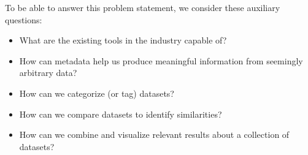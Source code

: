 To be able to answer this problem statement, we consider these auxiliary questions:
\begin{itemize}
    \item What are the existing tools in the industry capable of?
    \item How can metadata help us produce meaningful information from seemingly arbitrary data?
    \item How can we categorize (or tag) datasets?
    \item How can we compare datasets to identify similarities?
    \item How can we combine and visualize relevant results about a collection of datasets?
\end{itemize}